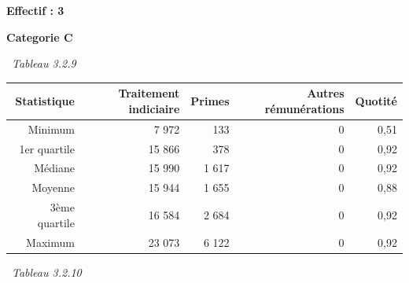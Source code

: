 \textbf{Effectif : 3 }

\textbf{Categorie C}

~\emph{Tableau 3.2.9}

\begin{longtable}[]{@{}rrrrr@{}}
\toprule
Statistique & Traitement indiciaire & Primes & Autres rémunérations &
Quotité\tabularnewline
\midrule
\endhead
Minimum & 7 972 & 133 & 0 & 0,51\tabularnewline
1er quartile & 15 866 & 378 & 0 & 0,92\tabularnewline
Médiane & 15 990 & 1 617 & 0 & 0,92\tabularnewline
Moyenne & 15 944 & 1 655 & 0 & 0,88\tabularnewline
3ème quartile & 16 584 & 2 684 & 0 & 0,92\tabularnewline
Maximum & 23 073 & 6 122 & 0 & 0,92\tabularnewline
\bottomrule
\end{longtable}

~\emph{Tableau 3.2.10}

